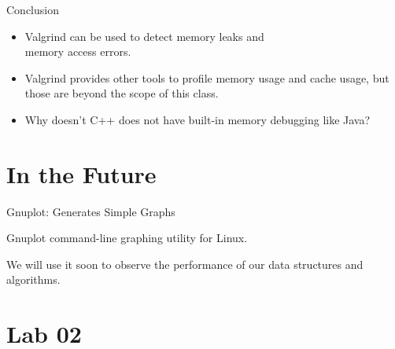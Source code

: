 \documentclass[14pt,aspectratio=1610]{beamer}
\begin{document}
\begin{frame}{Conclusion}
\begin{itemize}
\item Valgrind can be used to detect memory leaks and\\ memory access errors.
\item Valgrind provides other tools to profile memory usage and cache usage, but those are beyond the scope of this class.
\item Why doesn't C++ does not have built-in memory debugging like Java?
\end{itemize}
\end{frame}

\section{In the Future}

\begin{frame}{Gnuplot: Generates Simple Graphs}
\begin{center}\large
Gnuplot command-line graphing utility for Linux.

We will use it soon to observe the performance of our data structures and algorithms.
\end{center}
\end{frame}


\section*{Lab 02}
\end{document}
